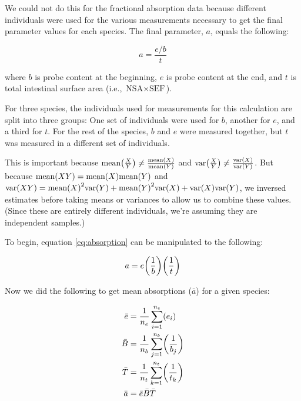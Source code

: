\documentclass[12pt,]{article}
\newcommand{\mean}[1]{\text{mean}\left( #1 \right)}
\newcommand{\var}[1]{\text{var}\left( #1 \right)}
\let\originalleft\left
\let\originalright\right
\renewcommand{\left}{\mathopen{}\mathclose\bgroup\originalleft}
\renewcommand{\right}{\aftergroup\egroup\originalright}
\begin{document}
We could not do this for the fractional absorption data because different
individuals were used for the various measurements necessary to get the final
parameter values for each species.
The final parameter, \(a\), equals the following:

\begin{equation}
\label{eq:absorption}
    a = \frac{ e / b }{ t }
\end{equation}

where \(b\) is probe content at the beginning,
\(e\) is probe content at the end,
and \(t\) is total intestinal surface area (i.e., \(\text{NSA} \times \text{SEF}\)).

For three species, the individuals used for measurements for this calculation are
split into three groups:
One set of individuals were used for \(b\), another for \(e\), and a third
for \(t\).
For the rest of the species, \(b\) and \(e\) were measured together, but
\(t\) was measured in a different set of individuals.

This is important because
\(\mean{ \frac{X}{Y} } \ne \frac{ \mean{X} }{ \mean{Y} }\) and
\(\var{ \frac{X}{Y} } \ne \frac{ \var{X} }{ \var{Y} }\).
But because \(\mean{ X Y } = \mean{X} \mean{Y}\) and
\(\var{XY} = \mean{X}^2 \var{Y} + \mean{Y}^2 \var{X} + \var{X} \var{Y}\),
we inversed estimates before taking means or variances to allow us to combine
these values.
(Since these are entirely different individuals, we're assuming they are
independent samples.)

To begin, equation \ref{eq:absorption} can be manipulated to the following:

\begin{equation}
\label{eq:absorption2}
    a = e \left( \frac{1}{b} \right) \left( \frac{1}{ t } \right)
\end{equation}

Now we did the following to get mean absorptions (\(\bar{a}\)) for a given species:

\begin{equation}
\label{eq:absorption3}
\begin{split}
    \bar{e} &= \frac{1}{n_e}\sum_{i=1}^{n_e}\left( e_i \right) \\
    \bar{B} &= \frac{1}{n_b}\sum_{j=1}^{n_b}\left( \frac{1}{ b_j } \right) \\
    \bar{T} &= \frac{1}{n_t}\sum_{k=1}^{n_t}\left( \frac{1}{ t_k } \right) \\
    \bar{a} &= \bar{e} \bar{B} \bar{T}
\end{split}
\end{equation}
\end{document}
